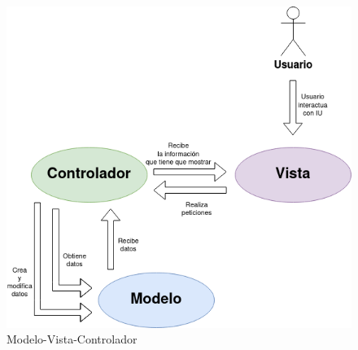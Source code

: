 \begin{figure}[H]
  \centering
  \includegraphics[width=\textwidth]{diagramas/mvc}
  \caption{Modelo-Vista-Controlador}
  \label{fig:mvc}
\end{figure}
